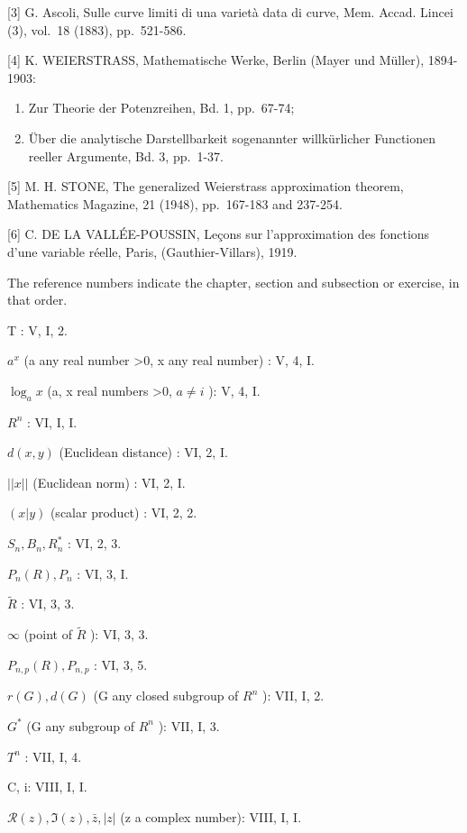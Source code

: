 {[}3{]} G. Ascoli, Sulle curve limiti di una varietà data di curve, Mem. Accad. Lincei (3), vol.~18 (1883), pp.~521-586.

{[}4{]} K. WEIERSTRASS, Mathematische Werke, Berlin (Mayer und Müller), 1894-1903:

\begin{enumerate}
\def\labelenumi{\alph{enumi})}
\item
  Zur Theorie der Potenzreihen, Bd. 1, pp.~67-74;
\item
  Über die analytische Darstellbarkeit sogenannter willkürlicher Functionen reeller Argumente, Bd. 3, pp.~1-37.
\end{enumerate}

{[}5{]} M. H. STONE, The generalized Weierstrass approximation theorem, Mathematics Magazine, 21 (1948), pp.~167-183 and 237-254.

{[}6{]} C. DE LA VALLÉE-POUSSIN, Leçons sur l'approximation des fonctions d'une variable réelle, Paris, (Gauthier-Villars), 1919.

The reference numbers indicate the chapter, section and subsection or exercise, in that order.

T : V, I, 2.

\(a^{x}\) (a any real number \textgreater0, x any real number) : V, 4, I.

\(\log_{a}x\) (a, x real numbers \textgreater0, \(a \neq i\) ): V, 4, I.

\(R^{n}\) : VI, I, I.

\(d(x, y)\) (Euclidean distance) : VI, 2, I.

\(||x||\) (Euclidean norm) : VI, 2, I.

\((x|y)\) (scalar product) : VI, 2, 2.

\(S_{n}, B_{n}, R_{n}^{*}\) : VI, 2, 3.

\(P_{n}(R), P_{n}\) : VI, 3, I.

\(\tilde{R}\) : VI, 3, 3.

\(\infty\) (point of \(\tilde{R}\) ): VI, 3, 3.

\(P_{n,p}(R), P_{n,p}\) : VI, 3, 5.

\(r(G), d(G)\) (G any closed subgroup of \(R^{n}\) ): VII, I, 2.

\(G^{*}\) (G any subgroup of \(R^{n}\) ): VII, I, 3.

\(T^{n}\) : VII, I, 4.

C, i: VIII, I, I.

\(\mathcal{R}(z), \Im(z), \bar{z}, |z|\) (z a complex number): VIII, I, I.

